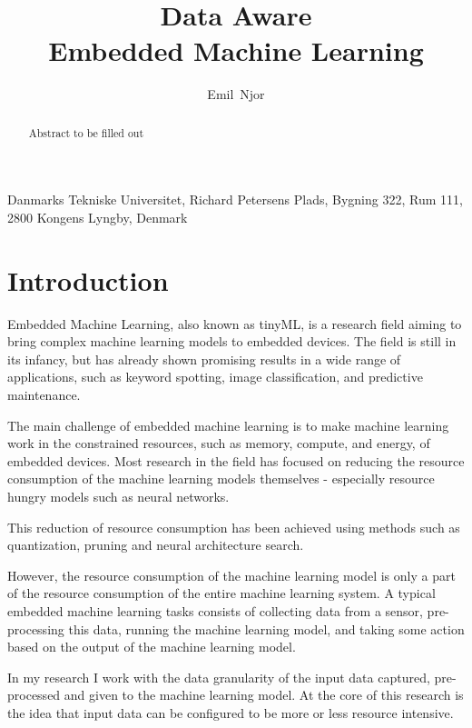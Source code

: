 \documentclass{acaces}
\begin{document}
\title{Data Aware\\Embedded Machine Learning
}

\author{
    Emil~Njor
}

\address{1}{
    Danmarks Tekniske Universitet,
    Richard Petersens Plads,
    Bygning 322,
    Rum 111,
    2800 Kongens Lyngby,
    Denmark
}


\pagestyle{empty}


\begin{abstract}
    Abstract to be filled out
    
\end{abstract}


\section{Introduction}
Embedded Machine Learning, also known as tinyML, is a research field aiming to bring complex machine learning models to embedded devices. 
The field is still in its infancy, but has already shown promising results in a wide range of applications, such as keyword spotting, image classification, and predictive maintenance.

The main challenge of embedded machine learning is to make machine learning work in the constrained resources, such as memory, compute, and energy, of embedded devices.
Most research in the field has focused on reducing the resource consumption of the machine learning models themselves - especially resource hungry models such as neural networks.

This reduction of resource consumption has been achieved using methods such as quantization, pruning and neural architecture search\cite{njor2022primer}.

However, the resource consumption of the machine learning model is only a part of the resource consumption of the entire machine learning system.
A typical embedded machine learning tasks consists of collecting data from a sensor, pre-processing this data, running the machine learning model, and taking some action based on the output of the machine learning model.

In my research I work with the data granularity of the input data captured, pre-processed and given to the machine learning model.
At the core of this research is the idea that input data can be configured to be more or less resource intensive.
\end{document}
